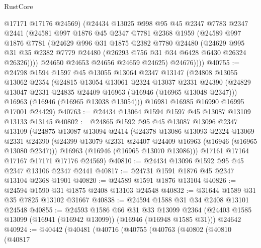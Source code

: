 \begin{lexlean}{RustCore}
\begin{coremodule}
            @17171
            @17176
            @24569)
          (@24434
            @13025
            @998
            @95
            @45
            @2347
            @7783
            @2347
            @2441
            (@24581
              @997
              @1876
              @45
              @2347
              @7781
              @2368
              @1959
              (@24589
                @997
                @1876
                @7781
                (@24629
                  @996
                  @31
                  @1875
                  @2382
                  @7780
                  @24480
                  (@24629
                    @995
                    @31
                    @35
                    @2382
                    @7779
                    @24480
                    (@26293 @756 @31 @34 @6428 @6430 @26324 @26326))))
              @24650
              @24653
              @24656
              @24659
              @24625)
            @24676))))
@40755 := @24798
    @1594
    @1597
    @45
    @13055
    @13064
    @2347
    @13147
    (@24808
      @13055
      @13062
      @2354
      (@24815
        @13054
        @13061
        @2324
        @13037
        @2331
        @24390
        (@24829 @13047 @2331 @24835 @24409 @16963 (@16946 (@16965 @13048 @2347)))
        @16963
        (@16946 (@16965 @13038 @13054)))
      @16981
      @16985
      @16990
      @16995
      @17001
      @24429)
@40763 := @24434 @13064 @1594 @1597 @45 @13087 @13109 @13133 @13145
@40802 := @24865
    @1592
    @95
    @45
    @13087
    @13096
    @2347
    @13109
    (@24875
      @13087
      @13094
      @2414
      (@24378
        @13086
        @13093
        @2324
        @13069
        @2331
        @24390
        (@24399 @13079 @2331 @24407 @24409 @16963 (@16946 (@16965 @13080 @2347)))
        @16963
        (@16946 (@16965 @13070 @13086)))
      @17161
      @17164
      @17167
      @17171
      @17176
      @24569)
@40810 := @24434 @13096 @1592 @95 @45 @2347 @13106 @2347 @2441
@40817 := @24731 @1591 @1876 @45 @2347 @13104 @2368 @1901
@40820 := @24589 @1591 @1876 @13104
@40826 := @24594 @1590 @31 @1875 @2408 @13103 @24548
@40832 := @31644 @1589 @31 @35 @7825 @13102 @31667
@40838 := @24594 @1588 @31 @34 @2408 @13101 @24548
@40855 := @24593
    @1586
    @66
    @31
    @33
    @13099
    @2364
    (@24403 @1585 @13099 (@16941 (@16942 @13099)) (@16946 (@16948 @1585 @31)))
    @24642
@40924 := @40442
    (@40481
      (@40716
        (@40755
          (@40763
            (@40802
              (@40810
                (@40817

\end{coremodule}
\end{lexlean}
